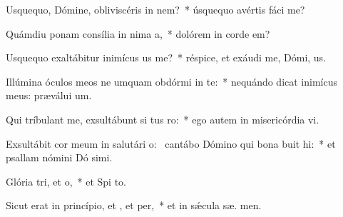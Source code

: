 \item Usquequo, Dómine, obliviscéris  in nem?~* úsquequo avértis fáci   me?
\item Quámdiu ponam consília in nima a,~* dolórem in corde   em?
\item Usquequo exaltábitur inimícus us  me?~* réspice, et exáudi me, Dómi,  us.
\item Illúmina óculos meos ne umquam obdórmi in te:~* nequándo dicat inimícus meus: præválui  um.
\item Qui tríbulant me, exsultábunt si tus ro:~* ego autem in misericórdia  vi.
\item Exsultábit cor meum in salutári o:~\pscross{} cantábo Dómino qui bona buit hi:~* et psallam nómini Dó simi.
\item Glória tri, et o,~* et Spi to.
\item Sicut erat in princípio, et , et per,~* et in sǽcula sæ. men.

